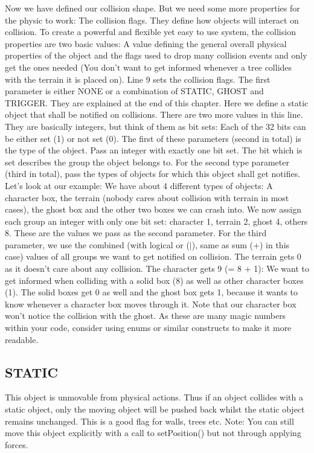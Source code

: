 \documentclass{article}
\begin{document}
Now we have defined our collision shape. But we need some more properties for the physic to work: The collision flags. They define how objects will interact on collision. To create a powerful and flexible yet easy to use system, the collision properties are two basic values: A value defining the general overall physical properties of the object and the flags used to drop many collision events and only get the ones needed (You don't want to get informed whenever a tree collides with the terrain it is placed on). Line 9 sets the collision flags. The first parameter is either NONE or a combination of STATIC, GHOST and TRIGGER. They are explained at the end of this chapter. Here we define a static object that shall be notified on collisions.\newline
There are two more values in this line. They are basically integers, but think of them as bit sets: Each of the 32 bits can be either set (1) or not set (0). The first of these parameters (second in total) is the type of the object. Pass an integer with exactly one bit set. The bit which is set describes the group the object belongs to. For the second type parameter (third in total), pass the types of objects for which this object shall get notifies. Let's look at our example: We have about 4 different types of objects: A character box, the terrain (nobody cares about collision with terrain in most cases), the ghost box and the other two boxes we can crash into. We now assign each group an integer with only one bit set: character 1, terrain 2, ghost 4, others 8. These are the values we pass as the second parameter. For the third parameter, we use the combined (with logical or ($|$), same as sum ($+$) in this case) values of all groups we want to get notified on collision. The terrain gets 0 as it doesn't care about any collision. The character gets 9 (= 8 + 1): We want to get informed when colliding with a solid box (8) as well as other character boxes (1). The solid boxes get 0 as well and the ghost box gets 1, because it wants to know whenever a character box moves through it. Note that our character box won't notice the collision with the ghost. As these are many magic numbers within your code, consider using enums or similar constructs to make it more readable.\newline

\subsection{STATIC}

This object is unmovable from physical actions. Thus if an object collides with a static object, only the moving object will be pushed back whilst the static object remains unchanged. This is a good flag for walls, trees etc. Note: You can still move this object explicitly with a call to setPosition() but not through applying forces.
\end{document}
